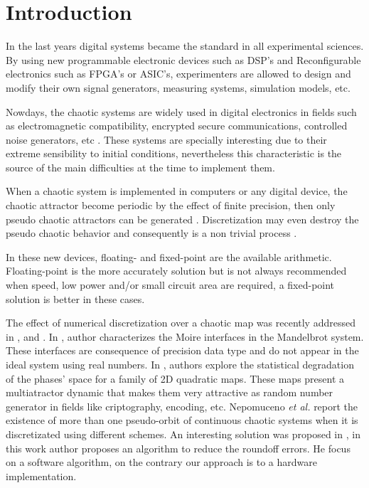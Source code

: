 \section{Introduction} \label{sec:intro}

In the last years digital systems became the standard in all experimental sciences.
By using new programmable electronic devices such as DSP's and Reconfigurable electronics such as FPGA's or ASIC's, experimenters are allowed to design and modify their own signal generators, measuring systems, simulation models, etc.

Nowdays, the chaotic systems are widely used in digital electronics in fields such as electromagnetic compatibility, encrypted secure communications, controlled noise generators, etc \cite{Machado2004,Smaoui2009,DeMicco2017,Antonelli2012,DeMicco2007A,DeMicco2007B}.
These systems are specially interesting due to their extreme sensibility to initial conditions, nevertheless this characteristic is the source of the main difficulties at the time to implement them.  

When a chaotic system is implemented in computers or any digital device, the chaotic attractor become periodic by the effect of finite precision, then only pseudo chaotic attractors can be generated \cite{Alcover2017,Dias2011}.
Discretization may even destroy the pseudo chaotic behavior and consequently is a non trivial process \cite{DeMicco2017,Azzaz2013}.

In these new devices, floating- and fixed-point are the available arithmetic.
Floating-point is the more accurately solution but is not always recommended when speed, low power and/or small circuit area are required, a fixed-point solution is better in these cases.

The effect of numerical discretization over a chaotic map was recently addressed in \cite{Alcover2017}, \cite{DeMicco2017} and \cite{Nepomuceno2017}.
In \cite{Alcover2017}, author characterizes the Moire interfaces in the Mandelbrot system.
These interfaces are consequence of precision data type and do not appear in the ideal system using real numbers.
In \cite{DeMicco2017}, authors explore the statistical degradation of the phases' space for a family of 2D quadratic maps.
These maps present a multiatractor dynamic that makes them very attractive as random number generator in fields like criptography, encoding, etc.
Nepomuceno \textit{et al.} \cite{Nepomuceno2017} report the existence of more than one pseudo-orbit of continuous chaotic systems when it is discretizated using different schemes.
An interesting solution was proposed in \cite{Liao2013}, in this work author proposes an algorithm to reduce the roundoff errors. He focus on a software algorithm, on the contrary our approach is to a hardware implementation.

